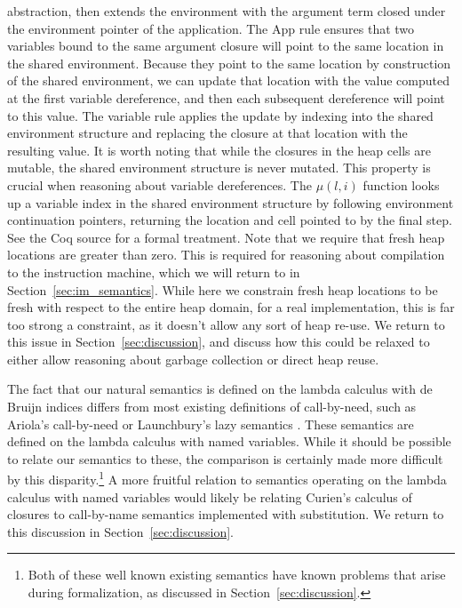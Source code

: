 abstraction, then extends the environment with the argument term closed under the
environment pointer of the application. The App rule ensures that two
variables bound to the same argument closure will point to the same location in
the shared environment. Because they point to the same location by construction
of the shared environment, we can update that location with the value computed
at the first variable dereference, and then each subsequent dereference will
point to this value. The variable rule applies the update by indexing into the
shared environment structure and replacing the closure at that location with the
resulting value. It is worth noting that while the closures in the heap cells
are mutable, the shared environment structure is never mutated. This property is
crucial when reasoning about variable dereferences. The $\mu\left(l, i\right)$
function looks up a variable index in the shared environment structure by
following environment continuation pointers, returning the location and cell
pointed to by the final step. See the Coq source
for a formal treatment. Note that we require that fresh heap locations are
greater than zero. This is required for reasoning about compilation to the
instruction machine, which we will return to in Section~\ref{sec:im_semantics}.
While here we constrain fresh heap locations to be fresh with respect to the
entire heap domain, for a real implementation, this is far too strong a
constraint, as it doesn't allow any sort of heap re-use. We return to this issue
in Section~\ref{sec:discussion}, and discuss how this could be relaxed to either
allow reasoning about garbage collection or direct heap reuse.

The fact that our natural semantics is defined on the lambda calculus with de Bruijn
indices differs from most existing definitions of call-by-need, such as
Ariola's call-by-need \cite{ariola1995call} or Launchbury's lazy semantics
\cite{launchburynatural}. These semantics are defined on the lambda calculus with named
variables. While it should be possible to relate our semantics to
these, the comparison is certainly made more difficult by this
disparity.\footnote{Both of these well known existing semantics have known
problems that arise during formalization, as discussed in
Section~\ref{sec:discussion}.} A more fruitful relation to semantics operating
on the lambda calculus with named variables would likely be relating Curien's
calculus of closures to call-by-name semantics implemented with substitution. We
return to this discussion in Section~\ref{sec:discussion}.

